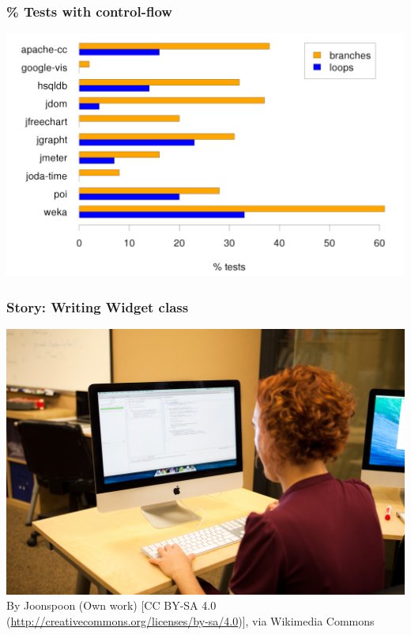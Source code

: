 \documentclass{beamer}
\begin{document}
\begin{frame}
  \frametitle{\% Tests with control-flow}
\begin{center}
\includegraphics[width=\textwidth, height=.8\textheight, keepaspectratio=true]{images/control-flow.png}
\end{center}
\end{frame}

\begin{frame}
\end{frame}

\begin{frame}
  \frametitle{Story: Writing Widget class} {\small	
     \includegraphics[width=\textwidth, keepaspectratio=true]{images/Programmer_writing_code_with_Unit_Tests.jpg}
     \tiny
     \linebreak
     By Joonspoon (Own work) [CC BY-SA 4.0 (\url{http://creativecommons.org/licenses/by-sa/4.0})], via Wikimedia Commons
  }
\end{frame}
\end{document}
